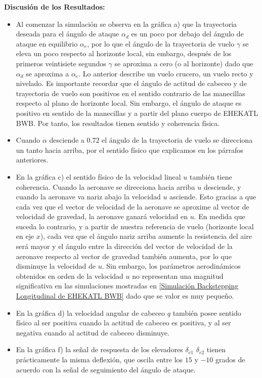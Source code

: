 \textbf{Discusión de los Resultados:}
\begin{itemize}
    \item Al comenzar la simulación se observa en la gráfica a) que la trayectoria deseada para el ángulo de ataque $\alpha_d$ es un poco por debajo del ángulo de ataque en equilibrio $\alpha_e$, por lo que el ángulo de la trayectoria de vuelo $\gamma$ se eleva un poco respecto al horizonte local, sin embargo, después de los primeros veintisiete segundos $\gamma$ se aproxima a cero (o al horizonte) dado que $\alpha_d$ se aproxima a $\alpha_e$. Lo anterior describe un vuelo crucero, un vuelo recto y nivelado. Es importante recordar  que el ángulo de actitud de cabeceo y de trayectoria de vuelo son positivos en el sentido contrario de las manecillas respecto al plano de horizonte local. Sin embargo, el ángulo de ataque es positivo en sentido de la manecillas y a partir del plano cuerpo de EHEKATL BWB. Por tanto, los resultados tienen sentido y coherencia física.
    \item Cuando $\alpha$ desciende a $0.72$ el ángulo de la trayectoria de vuelo se direcciona un tanto hacia arriba, por el sentido físico que explicamos en los párrafos anteriores.
    \item En la gráfica c) el sentido físico de la velocidad lineal $u$ también tiene coherencia. Cuando la aeronave se direcciona hacia arriba $u$ desciende, y cuando la aeronave va nariz abajo la velocidad $u$ asciende. Esto gracias a que cada vez que el vector de velocidad de la aeronave se aproxime al vector de velocidad de gravedad, la aeronave ganará velocidad en $u$. En medida que suceda lo contrario, y a partir de nuestra referencia de vuelo (horizonte local en eje $x$), cada vez que el ángulo nariz arriba aumente la resistencia del aire será mayor y el ángulo entre la dirección del vector de velocidad de la aeronave respecto al vector de gravedad también aumenta, por lo que disminuye la velocidad de $u$. 
    Sin embargo, los parámetros aerodinámicos obtenidos en orden de la velocidad $u$ no representan una magnitud significativa en las simulaciones mostradas en \ref{Simulación Backstepping Longitudinal de EHEKATL BWB} dado que se valor es muy pequeño. 
    \item En la gráfica d) la velocidad angular de cabeceo $q$ también posee sentido físico al ser positiva cuando la actitud de cabeceo es positiva, y al ser negativa cuando al actitud de cabeceo disminuye. 
    \item En la gráfica f) la señal de respuesta de los elevadores  $\delta_{e1}$ $\delta_{e2}$ tienen prácticamente la misma deflexión, que oscila entre los $15$ y $-10$ grados de acuerdo con la señal de seguimiento del ángulo de ataque. 

\end{itemize}
